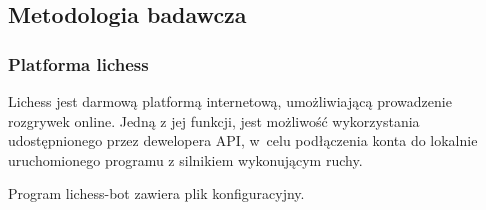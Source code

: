 \subsection{Metodologia badawcza}
\label{subsec:metodologia-badawcza}

\subsubsection{Platforma lichess}
Lichess jest darmową platformą internetową, umożliwiającą prowadzenie rozgrywek online.
Jedną z jej funkcji, jest możliwość wykorzystania udostępnionego przez dewelopera API, w~celu podłączenia konta do lokalnie uruchomionego programu z silnikiem wykonującym ruchy.

Program lichess-bot zawiera plik konfiguracyjny.